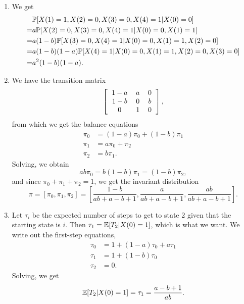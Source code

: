 \begin{enumerate}
\begin{enumerate}
        \item We get
        \begin{align*}
            &\P[X(1) = 1, X(2) = 0, X(3) = 0, X(4) = 1 | X(0) = 0] \\
            = &a\P[X(2) = 0, X(3) = 0, X(4) = 1 | X(0) = 0, X(1) = 1] \\
            = &a(1 - b)\P[X(3) = 0, X(4) = 1 | X(0) = 0, X(1) = 1, X(2) = 0] \\
            = &a(1 - b)(1 - a)\P[X(4) = 1 | X(0) = 0, X(1) = 1, X(2) = 0, X(3) = 0] \\
            = &a^2(1 - b)(1 - a).
        \end{align*}
        
        \item We have the transition matrix
        \[
        \left[\begin{tabular}{ccc}
            $1 - a$ & $a$ & 0 \\
            $1 - b$ & 0 & $b$ \\
            0 & 1 & 0
        \end{tabular}\right],
        \]
        from which we get the balance equations
        \begin{align*}
            \pi_0 &= (1 - a)\pi_0 + (1 - b)\pi_1 \\
            \pi_1 &= a\pi_0 + \pi_2 \\
            \pi_2 &= b\pi_1.
        \end{align*}
        Solving, we obtain
        \[
        ab\pi_0 = b(1 - b)\pi_1 = (1 - b)\pi_2,
        \]
        and since $\pi_0 + \pi_1 + \pi_2 = 1$, we get the invariant distribution
        \[
            \pi = [\pi_0, \pi_1, \pi_2] = \left[\frac{1 - b}{ab + a - b + 1}, \frac{a}{ab + a - b + 1}, \frac{ab}{ab + a - b + 1}\right].
        \]
        
        \item Let $\tau_i$ be the expected number of steps to get to state 2 given that the starting state is $i$. Then $\tau_1 = \E[T_2 | X(0) = 1]$, which is what we want. We write out the first-step equations,
        \begin{align*}
            \tau_0 &= 1 + (1 - a)\tau_0 + a\tau_1 \\
            \tau_1 &= 1 + (1 - b)\tau_0 \\
            \tau_2 &= 0.
        \end{align*}
        Solving, we get
        \[
        \E[T_2 | X(0) = 1] = \tau_1 = \frac{a - b + 1}{ab}.
        \]
    \end{enumerate}
    

\end{enumerate}
